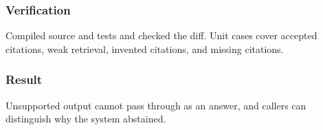 \subsubsection{Verification}

Compiled source and tests and checked the diff. Unit cases cover accepted citations, weak retrieval, invented citations, and missing citations.

\subsubsection{Result}

Unsupported output cannot pass through as an answer, and callers can distinguish why the system abstained.

